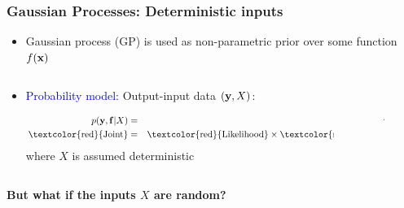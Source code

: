 \documentclass{beamer}
\begin{document}
\frame
{

\frametitle{Gaussian Processes: Deterministic inputs}

\begin{itemize}

\item Gaussian process (GP) is used as non-parametric prior 
      over some function \textcolor{red}{$f(\mathbf{x})$}




\end{itemize}


\begin{columns}
\begin{column}[t]{8cm}

\begin{itemize}

\item \textcolor{blue}{Probability model:} Output-input data $(\mathbf{y},X)$: 


\begin{eqnarray}
p(\bfy,\bff|X) & = &  p(\bfy|\bff) \times p(\bff|X) \nonumber \\
\text{\textcolor{red}{Joint}} & = & \text{\textcolor{red}{Likelihood}}
\times \text{\textcolor{red}{marginal GP on X}} \nonumber
\end{eqnarray}
where $X$ is assumed deterministic 
 
\end{itemize}

\end{column}

\begin{column}[t]{2cm}
\begin{figure}
\includegraphics[width=7mm,height=20mm]{../../../vargplvm/tex/diagrams/net1}
\end{figure}

\end{column}
\end{columns}

\vspace{0.3cm}

{\bf But what if the inputs $X$ are random?}

}
\end{document}
